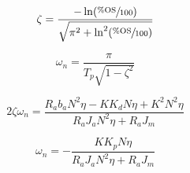 \documentclass[12pt]{report}
\renewcommand\thesection{\arabic{section}}
\begin{document}
\begin{equation}
  \zeta = \frac{-\ln(\sfrac{\%\text{OS}}{100})}{\sqrt{\pi^2 + \ln^2(\sfrac{\%\text{OS}}{100})}}
\end{equation}

\begin{equation}
  \omega_n = \frac{\pi}{T_p\sqrt{1-\zeta^2}}
\end{equation}

\begin{equation}
  2\zeta\omega_n = \frac{R_ab_aN^2\eta-KK_dN\eta+K^2N^2\eta}{R_aJ_aN^2\eta+R_aJ_m}
\end{equation}

\begin{equation}
  \omega_n =-\frac{KK_pN\eta}{R_aJ_aN^2\eta+R_aJ_m}
\end{equation}















% 
% 



% 
\end{document}

